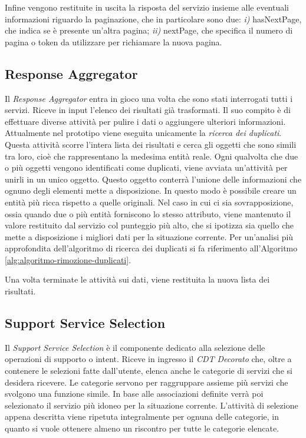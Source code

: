 Infine vengono restituite in uscita la risposta del servizio insieme alle eventuali informazioni riguardo la paginazione, che in particolare sono due: \emph{i)} hasNextPage, che indica se è presente un'altra pagina; \emph{ii)} nextPage, che specifica il numero di pagina o token da utilizzare per richiamare la nuova pagina.

\subsection{Response Aggregator\label{sec:response-aggregator}}

Il \emph{Response Aggregator} entra in gioco una volta che sono stati interrogati tutti i servizi. Riceve in input l'elenco dei risultati già trasformati. Il suo compito è di effettuare diverse attività per pulire i dati o aggiungere ulteriori informazioni. Attualmente nel prototipo viene eseguita unicamente la \emph{ricerca dei duplicati}. Questa attività scorre l'intera lista dei risultati e cerca gli oggetti che sono simili tra loro, cioè che rappresentano la medesima entità reale. Ogni qualvolta che due o più oggetti vengono identificati come duplicati, viene avviata un'attività per unirli in un unico oggetto. Questo oggetto conterrà l'unione delle informazioni che ognuno degli elementi mette a disposizione. In questo modo è possibile creare un entità più ricca rispetto a quelle originali. Nel caso in cui ci sia sovrapposizione, ossia quando due o più entità forniscono lo stesso attributo, viene mantenuto il valore restituito dal servizio col punteggio più alto, che si ipotizza sia quello che mette a disposizione i migliori dati per la situazione corrente. Per un'analisi più approfondita dell'algoritmo di ricerca dei duplicati si fa riferimento all'Algoritmo \ref{alg:algoritmo-rimozione-duplicati}.

Una volta terminate le attività sui dati, viene restituita la nuova lista dei risultati.

\subsection{Support Service Selection\label{sec:support-service-selection}}

Il \emph{Support Service Selection} è il componente dedicato alla selezione delle operazioni di supporto o intent. Riceve in ingresso il \emph{CDT Decorato} che, oltre a contenere le selezioni fatte dall'utente, elenca anche le categorie di servizi che si desidera ricevere. Le categorie servono per raggruppare assieme più servizi che svolgono una funzione simile. In base alle associazioni definite verrà poi selezionato il servizio più idoneo per la situazione corrente. L'attività di selezione appena descritta viene ripetuta integralmente per ognuna delle categorie, in quanto si vuole ottenere almeno un riscontro per tutte le categorie elencate.


